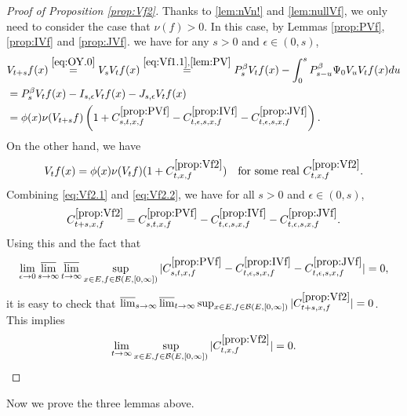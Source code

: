 \documentclass[12pt,a4paper]{amsart}
\numberwithin{equation}{section}
\theoremstyle{plain}
\theoremstyle{definition}
\theoremstyle{remark}
\begin{document}
\begin{proof}[{Proof of Proposition \ref{prop:Vf2}}]
Thanks to \eqref{lem:nVn!} and \eqref{lem:nullVf}, we only need to consider the case that $\nu(f)>0$.
	In this case,
by Lemmas \ref{prop:PVf}, \ref{prop:IVf} and \ref{prop:JVf}.
we have for any $s>0$ and $\epsilon\in (0,s)$,
\begin{align}
	& V_{t+s}f (x)
	\overset{\eqref{eq:OY.0}}= V_s V_t f(x)
	\overset{\eqref{eq:Vf1.1},\eqref{lem:PV}}= P_s^\beta V_t f(x) - \int_0^s P^\beta_{s-u}\Psi_0 V_uV_t f(x) du
	\\&= P_s^\beta V_t f(x) - I_{s,\epsilon} V_tf(x) - J_{s,\epsilon} V_t f(x)
	\\\label{eq:Vf2.1} &=\phi(x)\nu(V_{t+s}f) \left( 1+ C^{\ref{prop:PVf}}_{s,t,x,f} - C^{\ref{prop:IVf}}_{t,\epsilon, s, x,f}- C^{\ref{prop:JVf}}_{t,\epsilon,s,x,f}\right).
\end{align}
	On the other hand, we have
\begin{equation}\label{eq:Vf2.2}
	V_{t}f (x)
	= \phi(x) \nu(V_{t}f) (1+ C^{\ref{prop:Vf2}}_{t,x,f})
	\quad \text{for some real $C^{\ref{prop:Vf2}}_{t,x,f}$}.
\end{equation}
	Combining \eqref{eq:Vf2.1} and \eqref{eq:Vf2.2}, we have for all $s>0$ and $\epsilon \in (0,s)$,
\[
	C^{\ref{prop:Vf2}}_{t+s,x,f} = C^{\ref{prop:PVf}}_{s,t,x,f} - C^{\ref{prop:IVf}}_{t,\epsilon, s, x,f}- C^{\ref{prop:JVf}}_{t,\epsilon,s,x,f}.
\]
	 Using this and the fact that
\[
	\lim_{\epsilon \to 0}\varlimsup_{s\to \infty}\varlimsup_{t\to \infty}
	\sup_{x\in E, f\in \mathcal B(E,[0,\infty])}
	|C^{\ref{prop:PVf}}_{s,t,x,f} - C^{\ref{prop:IVf}}_{t,\epsilon, s, x,f}- C^{\ref{prop:JVf}}_{t,\epsilon,s,x,f}|=0,
\]
	it is easy to check that $\varlimsup_{s\to \infty}\varlimsup_{t\to \infty}
\sup_{x\in E, f\in \mathcal B(E,[0,\infty])}
	|C^{\ref{prop:Vf2}}_{t+s,x,f}|=0$.
	This implies
\[
	\lim_{t\to \infty}
\sup_{x\in E, f\in \mathcal B(E,[0,\infty])}
	|C^{\ref{prop:Vf2}}_{t,x,f}|=0.
	\qedhere
\]
\end{proof}

	Now we prove the three lemmas above.
\end{document}

